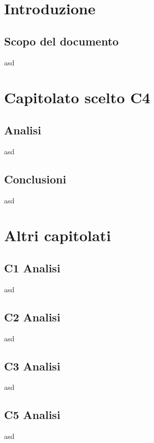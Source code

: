 
\section{Introduzione}
\subsection{Scopo del documento}
asd\\

\section{Capitolato scelto C4}
\subsection{Analisi}
asd\\
\subsection{Conclusioni}
asd\\

\section{Altri capitolati}
\subsection{C1 Analisi}
asd\\
\subsection{C2 Analisi}
asd\\
\subsection{C3 Analisi}
asd\\
\subsection{C5 Analisi}
asd\\
